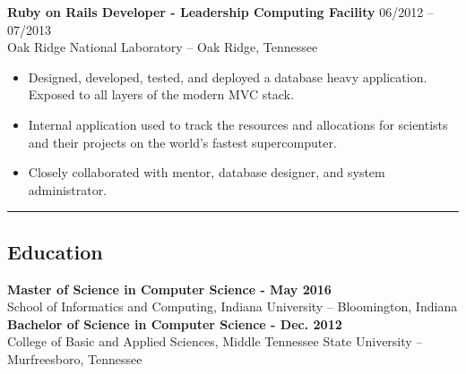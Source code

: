 \documentclass[12pt,letterpaper]{article}
\begin{document}
\noindent\textbf{Ruby on Rails Developer - Leadership Computing Facility}
\hfill{06/2012 -- 07/2013} \\
Oak Ridge National Laboratory -- Oak Ridge, Tennessee

\begin{itemize}

	\item Designed, developed, tested, and deployed a database heavy application. Exposed to all layers of the modern MVC stack.

  \item Internal application used to track the resources and allocations for scientists and their projects on the world's fastest supercomputer.

  \item Closely collaborated with mentor, database designer, and system administrator.

\end{itemize}

\noindent\rule{7.5in}{0.4pt}

\subsection*{Education}

\textbf{Master of Science in Computer Science - May 2016} \\
\bigskip School of Informatics and Computing, Indiana University -- Bloomington, Indiana \\
\noindent\textbf{Bachelor of Science in Computer Science - Dec. 2012} \\
College of Basic and Applied Sciences, Middle Tennessee State University -- Murfreesboro, Tennessee
\end{document}
